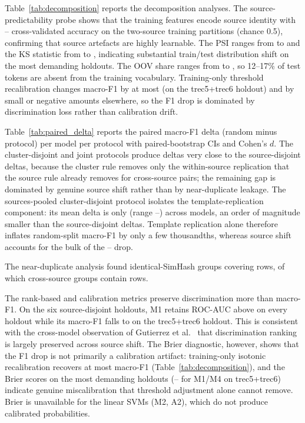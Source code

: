 \documentclass[conference]{IEEEtran}
\begin{document}
Table~\ref{tab:decomposition} reports the decomposition analyses. The source-predictability probe shows that the training features encode source identity with \SourcePredMin{}--\SourcePredMax{} cross-validated accuracy on the two-source training partitions (chance 0.5), confirming that source artefacts are highly learnable. The PSI ranges from \PSIMin{} to \PSIMax{} and the KS statistic from \KSMin{} to \KSMax{}, indicating substantial train/test distribution shift on the most demanding holdouts. The OOV share ranges from \OOVMin{} to \OOVMax{}, so 12--17\% of test tokens are absent from the training vocabulary. Training-only threshold recalibration changes macro-F1 by at most \RecalMaxGain{} (on the trec5+trec6 holdout) and by small or negative amounts elsewhere, so the F1 drop is dominated by discrimination loss rather than calibration drift.



Table~\ref{tab:paired_delta} reports the paired macro-F1 delta (random minus protocol) per model per protocol with paired-bootstrap CIs and Cohen's $d$. The cluster-disjoint and joint protocols produce deltas very close to the source-disjoint deltas, because the cluster rule removes only the within-source replication that the source rule already removes for cross-source pairs; the remaining gap is dominated by genuine source shift rather than by near-duplicate leakage. The sources-pooled cluster-disjoint protocol isolates the template-replication component: its mean delta is only \PooledClusterGapMean{} (range \PooledClusterGapMin{}--\PooledClusterGapMax{}) across models, an order of magnitude smaller than the source-disjoint deltas. Template replication alone therefore inflates random-split macro-F1 by only a few thousandths, whereas source shift accounts for the bulk of the \GapMeanMTwo{}--\GapMeanMFour{} drop.



The near-duplicate analysis found \NExactDupGroups{} identical-SimHash groups covering \NExactDupRows{} rows, of which \NExactDupCrossGroups{} cross-source groups contain \NExactDupCrossRows{} rows.

The rank-based and calibration metrics preserve discrimination more than macro-F1. On the six source-disjoint holdouts, M1 retains ROC-AUC above \MOneROCaucMinNoDigit{} on every holdout while its macro-F1 falls to \MOneFOneTrecNoDigit{} on the trec5+trec6 holdout. This is consistent with the cross-model observation of Gutierrez et al.~\cite{gutierrez_crossmodel_2026} that discrimination ranking is largely preserved across source shift. The Brier diagnostic, however, shows that the F1 drop is not primarily a calibration artifact: training-only isotonic recalibration recovers at most \RecalMaxGain{} macro-F1 (Table~\ref{tab:decomposition}), and the Brier scores on the most demanding holdouts (\MOneBrierTrecNoDigit{}--\MFourBrierTrecNoDigit{} for M1/M4 on trec5+trec6) indicate genuine miscalibration that threshold adjustment alone cannot remove. Brier is unavailable for the linear SVMs (M2, A2), which do not produce calibrated probabilities.
\end{document}
